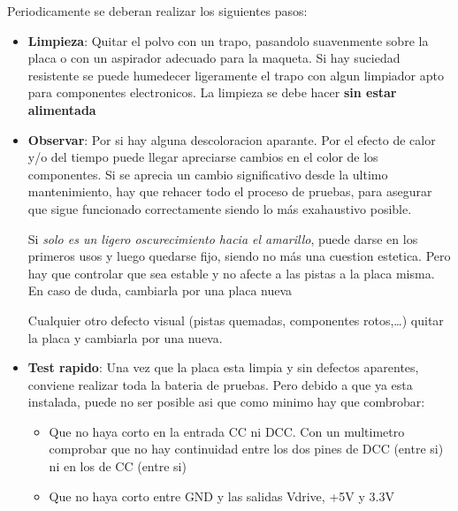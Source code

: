 Periodicamente se deberan realizar los siguientes pasos:
\begin{itemize}
\item \textbf{Limpieza}: Quitar el polvo con un trapo, pasandolo suavenmente sobre la placa o con un aspirador adecuado para la maqueta.
Si hay suciedad resistente se puede humedecer ligeramente el trapo con algun limpiador apto para
componentes electronicos. La limpieza se debe hacer \textbf{sin estar alimentada}

\item \textbf{Observar}: Por si hay alguna descoloracion aparante. Por el efecto de calor y/o del tiempo puede llegar apreciarse cambios
en el color de los componentes. Si se aprecia un cambio significativo desde la ultimo mantenimiento,
hay que rehacer todo el proceso de pruebas, para asegurar que sigue funcionado correctamente siendo
lo más exahaustivo posible. 

Si \textit{solo es un ligero oscurecimiento hacia el amarillo}, puede darse en los primeros usos y
luego quedarse fijo, siendo no más una cuestion estetica. Pero hay que controlar que sea estable y
no afecte a las pistas a la placa misma. En caso de duda, cambiarla por una placa nueva

Cualquier otro defecto visual (pistas quemadas, componentes rotos,\dots) quitar la placa y cambiarla por una nueva.
\item \textbf{Test rapido}: Una vez que la placa esta limpia y sin defectos aparentes, conviene
realizar toda la bateria de pruebas. Pero debido a que ya esta instalada, puede no ser posible asi
que como minimo hay que combrobar:
\begin{itemize}
\item Que no haya corto en la entrada CC ni DCC. Con un multimetro comprobar que no hay continuidad entre los dos pines de DCC (entre si) ni en los de CC (entre si)
\item Que no haya corto entre GND y las salidas Vdrive, +5V y 3.3V
\end{itemize}

\end{itemize}

